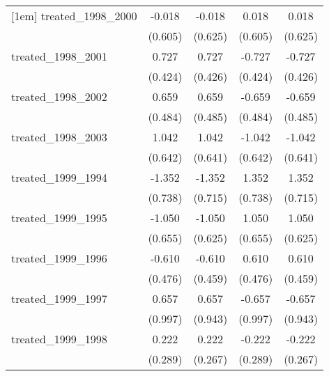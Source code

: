 {\begin{tabular}{l*{4}{c}}
[1em]
treated\_1998\_2000&      -0.018         &      -0.018         &       0.018         &       0.018         \\
            &     (0.605)         &     (0.625)         &     (0.605)         &     (0.625)         \\
[1em]
treated\_1998\_2001&       0.727         &       0.727         &      -0.727         &      -0.727         \\
            &     (0.424)         &     (0.426)         &     (0.424)         &     (0.426)         \\
[1em]
treated\_1998\_2002&       0.659         &       0.659         &      -0.659         &      -0.659         \\
            &     (0.484)         &     (0.485)         &     (0.484)         &     (0.485)         \\
[1em]
treated\_1998\_2003&       1.042         &       1.042         &      -1.042         &      -1.042         \\
            &     (0.642)         &     (0.641)         &     (0.642)         &     (0.641)         \\
[1em]
treated\_1999\_1994&      -1.352         &      -1.352         &       1.352         &       1.352         \\
            &     (0.738)         &     (0.715)         &     (0.738)         &     (0.715)         \\
[1em]
treated\_1999\_1995&      -1.050         &      -1.050         &       1.050         &       1.050         \\
            &     (0.655)         &     (0.625)         &     (0.655)         &     (0.625)         \\
[1em]
treated\_1999\_1996&      -0.610         &      -0.610         &       0.610         &       0.610         \\
            &     (0.476)         &     (0.459)         &     (0.476)         &     (0.459)         \\
[1em]
treated\_1999\_1997&       0.657         &       0.657         &      -0.657         &      -0.657         \\
            &     (0.997)         &     (0.943)         &     (0.997)         &     (0.943)         \\
[1em]
treated\_1999\_1998&       0.222         &       0.222         &      -0.222         &      -0.222         \\
            &     (0.289)         &     (0.267)         &     (0.289)         &     (0.267)         \\

\end{tabular}}
